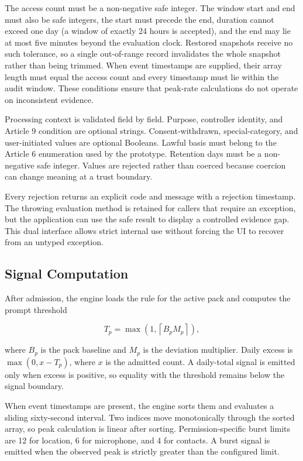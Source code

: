 The access count must be a non-negative safe integer. The window start and end must also be safe integers, the start must precede the end, duration cannot exceed one day (a window of exactly 24 hours is accepted), and the end may lie at most five minutes beyond the evaluation clock. Restored snapshots receive no such tolerance, so a single out-of-range record invalidates the whole snapshot rather than being trimmed. When event timestamps are supplied, their array length must equal the access count and every timestamp must lie within the audit window. These conditions ensure that peak-rate calculations do not operate on inconsistent evidence.

Processing context is validated field by field. Purpose, controller identity, and Article 9 condition are optional strings. Consent-withdrawn, special-category, and user-initiated values are optional Booleans. Lawful basis must belong to the Article 6 enumeration used by the prototype. Retention days must be a non-negative safe integer. Values are rejected rather than coerced because coercion can change meaning at a trust boundary.

Every rejection returns an explicit code and message with a rejection timestamp. The throwing evaluation method is retained for callers that require an exception, but the application can use the safe result to display a controlled evidence gap. This dual interface allows strict internal use without forcing the UI to recover from an untyped exception.

\subsection{Signal Computation}

After admission, the engine loads the rule for the active pack and computes the prompt threshold

\begin{equation}
T_p=\max\left(1,\left\lceil B_pM_p\right\rceil\right),
\end{equation}

where \(B_p\) is the pack baseline and \(M_p\) is the deviation multiplier. Daily excess is \(\max(0,x-T_p)\), where \(x\) is the admitted count. A daily-total signal is emitted only when excess is positive, so equality with the threshold remains below the signal boundary.

When event timestamps are present, the engine sorts them and evaluates a sliding sixty-second interval. Two indices move monotonically through the sorted array, so peak calculation is linear after sorting. Permission-specific burst limits are 12 for location, 6 for microphone, and 4 for contacts. A burst signal is emitted when the observed peak is strictly greater than the configured limit.

